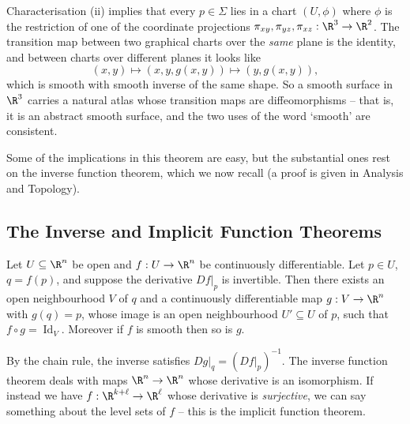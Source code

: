\begin{remark}
    Characterisation (ii) implies that every $p \in \Sigma$ lies in a chart $(U, \phi)$ where $\phi$ is the restriction of one of the coordinate projections $\pi_{xy}, \pi_{yz}, \pi_{xz}: \R^3 \rightarrow \R^2$. The transition map between two graphical charts over the \emph{same} plane is the identity, and between charts over different planes it looks like
    $$
    (x, y) \mapsto (x, y, g(x,y)) \mapsto (y, g(x, y)),
    $$
    which is smooth with smooth inverse of the same shape. So a smooth surface in $\R^3$ carries a natural atlas whose transition maps are diffeomorphisms -- that is, it is an abstract smooth surface, and the two uses of the word `smooth' are consistent.
\end{remark}

Some of the implications in this theorem are easy, but the substantial ones rest on the inverse function theorem, which we now recall (a proof is given in Analysis and Topology).

\subsection{The Inverse and Implicit Function Theorems}

\begin{theorem}
    Let $U \subseteq \R^n$ be open and $f: U \rightarrow \R^n$ be continuously differentiable. Let $p \in U$, $q = f(p)$, and suppose the derivative $\left.Df\right|_p$ is invertible. Then there exists an open neighbourhood $V$ of $q$ and a continuously differentiable map $g: V \rightarrow \R^n$ with $g(q) = p$, whose image is an open neighbourhood $U' \subseteq U$ of $p$, such that $f \circ g = \operatorname{Id}_V$. Moreover if $f$ is smooth then so is $g$.
\end{theorem}

By the chain rule, the inverse satisfies $\left.Dg\right|_q = (\left.Df\right|_p)^{-1}$.
The inverse function theorem deals with maps $\R^n \rightarrow \R^n$ whose derivative is an isomorphism. If instead we have $f : \R^{k + \ell} \rightarrow \R^\ell$ whose derivative is \emph{surjective}, we can say something about the level sets of $f$ -- this is the implicit function theorem.

